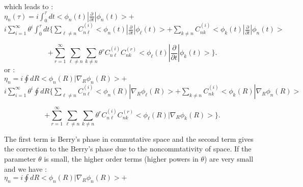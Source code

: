 \documentclass[a4paper,a4paper]{article}
\begin{document}
which leads to :\\

$\eta_{n}(\tau)=i\int_{0}^{\tau} dt<\phi_{n}(t)|\frac{\partial}{\partial
t}|\phi_{n}(t)>+$\\

$i\sum_{i=1}^{\infty}\theta^{i}\int_{0}^{\tau} dt\{ \sum_{\ell\neq
n}C^{(i)}_{n\ell}<\phi_{n}(t)|\frac{\partial}{\partial
t}|\phi_{\ell}(t)>+\sum_{k\neq
n}C^{(i)}_{nk}<\phi_{k}(t)|\frac{\partial}{\partial
t}|\phi_{n}(t)>$

\begin{equation}
+ \sum_{r=1}^{\infty}\sum_{\ell\neq
n}\sum_{k\neq
n}\theta^{r}
C_{n\ell}^{(i)}C_{nk}^{(r)}<\phi_{\ell}(t)|\frac{\partial}{\partial
t}|\phi_{k}(t)>\} .
\end{equation}
or :\\

$\eta_{n}=i\oint dR<\phi_{n}(R)|
\nabla_{R}\phi_{n}(R)>+$\\

$i\sum_{i=1}^{\infty}\theta^{i}\oint dR\{ \sum_{\ell\neq
n}C^{(i)}_{n\ell}<\phi_{n}(R)|
\nabla_{R}\phi_{\ell}(R)>+\sum_{k\neq
n}C^{(i)}_{nk}<\phi_{k}(R)|
\nabla_{R}\phi_{n}(R)>$

\begin{equation}
+ \sum_{r=1}^{\infty}\sum_{\ell\neq
n}\sum_{k\neq
n}\theta^{r} C_{n\ell}^{(i)}C_{nk}^{(r)}<\phi_{\ell}(R)|
\nabla_{R}\phi_{k}(R)>\} .
\end{equation}

The first term is Berry's phase in commutative space and the
second term gives the correction to the Berry's phase due to the
noncommtativity of space. If the parameter $\theta$ is small, the higher
order
terms (higher powers in $\theta$) are very small and we have : \\

$\eta_{n}=i\oint dR<\phi_{n}(R)|
\nabla_{R}\phi_{n}(R)>+ $
\end{document}
